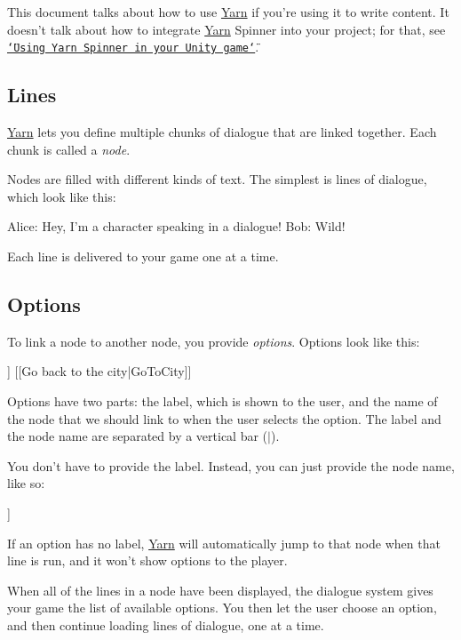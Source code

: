 This document talks about how to use \hyperlink{a00040}{Yarn} if you're using it to write content. It doesn't talk about how to integrate \hyperlink{a00040}{Yarn} Spinner into your project; for that, see \href{../YarnSpinner-Unity}{\tt \char`\"{}\-Using Yarn Spinner in your Unity game\char`\"{}}.

\subsection*{Lines}

\hyperlink{a00040}{Yarn} lets you define multiple chunks of dialogue that are linked together. Each chunk is called a {\itshape node}.

Nodes are filled with different kinds of text. The simplest is lines of dialogue, which look like this\-: \begin{DoxyVerb}Alice: Hey, I'm a character speaking in a dialogue!
Bob: Wild!
\end{DoxyVerb}


Each line is delivered to your game one at a time.

\subsection*{Options}

To link a node to another node, you provide {\itshape options}. Options look like this\-: \begin{DoxyVerb}[[Go to the woods|GoToWoods]]
[[Go back to the city|GoToCity]]
\end{DoxyVerb}


Options have two parts\-: the label, which is shown to the user, and the name of the node that we should link to when the user selects the option. The label and the node name are separated by a vertical bar ({\ttfamily $\vert$}).

You don't have to provide the label. Instead, you can just provide the node name, like so\-: \begin{DoxyVerb}[[GoToCity]]
\end{DoxyVerb}


If an option has no label, \hyperlink{a00040}{Yarn} will automatically jump to that node when that line is run, and it won't show options to the player.

When all of the lines in a node have been displayed, the dialogue system gives your game the list of available options. You then let the user choose an option, and then continue loading lines of dialogue, one at a time.

